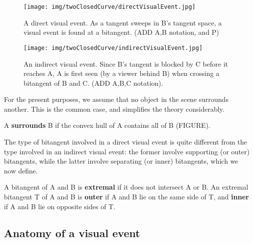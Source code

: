 \documentclass[12pt]{article}
\newif\ifCommentary             %
\begin{document}
\begin{figure}[h]
\begin{center}
\texttt{[image: img/twoClosedCurve/directVisualEvent.jpg]}
\end{center}
\caption{A direct visual event.  As a tangent sweeps in B's tangent space, a visual
  event is found at a bitangent. (ADD A,B notation, and P)}
\label{fig:directvisualevent}
\end{figure}

\begin{figure}[h]
\begin{center}
\texttt{[image: img/twoClosedCurve/indirectVisualEvent.jpg]}
\end{center}
\caption{An indirect visual event.  Since B's tangent is blocked by C
         before it reaches A, A is first seen (by a viewer behind B) when crossing a
	 bitangent of B and C. (ADD A,B,C notation).}
\label{fig:indirectvisualevent}
\end{figure}

For the present purposes, we assume that no object in the scene surrounds another.
This is the common case, and simplifies the theory considerably.

\begin{defn2}
A {\bf surrounds} B if the convex hull of A contains all of B (FIGURE).
\end{defn2}

The type of bitangent involved in a direct visual event is quite different
from the type involved in an indirect visual event:
the former involve supporting (or outer) bitangents,
while the latter involve separating (or inner) bitangents, 
which we now define.

\begin{defn2}
\label{defn:extremal}
A bitangent of A and B is {\bf extremal} if it does not intersect A or 
B.\ifCommentary\footnote{Clearly, points 
  of tangency are not counted as intersections.}\fi
\label{defn:outerbitang}
An extremal bitangent T of A and B is {\bf outer} if A and B lie on the same side of T,
and {\bf inner} if A and B lie on opposite sides of T.
\end{defn2}

\clearpage

\subsection{Anatomy of a visual event}
\end{document}

